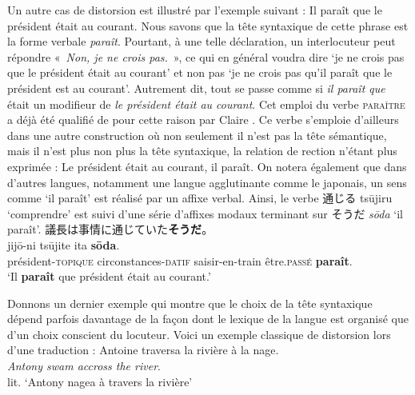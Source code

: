 {    Un autre cas de distorsion est illustré par l’exemple suivant :
    \ea
    {Il paraît que le président était au courant.}
    \z
    Nous savons que la tête syntaxique de cette phrase est la forme verbale \textit{paraît}. Pourtant, à une telle déclaration, un interlocuteur peut répondre «~\textit{Non, je ne crois pas.}~», ce qui en général voudra dire ‘je ne crois pas que le président était au courant’ et non pas ‘je ne crois pas qu’il paraît que le président est au courant’. Autrement dit, tout se passe comme si \textit{il paraît que} était un modifieur de \textit{le président était au courant}. Cet emploi du verbe \textsc{paraître} a déjà été qualifié de  pour cette raison par Claire \citet{blanche-benveniste1989constructions}. Ce verbe s’emploie d’ailleurs dans une autre construction où non seulement il n’est pas la tête sémantique, mais il n’est plus non plus la tête syntaxique, la relation de rection n’étant plus exprimée :
    \ea
    {Le président était au courant, il paraît.}
    \z
    On notera également que dans d’autres langues, notamment une langue agglutinante comme le japonais, un sens comme ‘il paraît’ est réalisé par un affixe verbal. Ainsi, le verbe {\cjkfont 通じる} tsūjiru ‘comprendre’ est suivi d’une série d’affixes modaux terminant sur {\cjkfont そうだ} \textit{sōda} ‘il paraît’.
    \ea\relax
    {\cjkfont 議長は事情に通じていた\textbf{そうだ}。}\\
      {jijō-ni}  {tsūjite}  {ita} \textbf{{sōda}}.\\
    président-\textsc{topique} circonstances-\textsc{datif} saisir-en-train être.\textsc{passé} \textbf{paraît}.\\
    ‘Il \textbf{paraît} que président était au courant.’
    \z

    Donnons un dernier exemple qui montre que le choix de la tête syntaxique dépend parfois davantage de la façon dont le lexique de la langue est organisé que d’un choix conscient du locuteur. Voici un exemple classique de distorsion lors d’une traduction :
    \ea
    {Antoine traversa la rivière à la nage}.\\
    \textit{Antony swam accross the river}.\\
    lit. `Antony nagea à travers la rivière'
    \z

}
